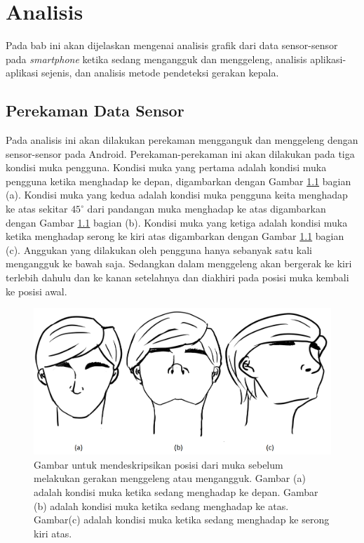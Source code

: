 \chapter{Analisis}
\label{chap:analisis}

Pada bab ini akan dijelaskan mengenai analisis grafik dari data sensor-sensor pada \textit{smartphone} ketika sedang mengangguk dan menggeleng, analisis aplikasi-aplikasi sejenis, dan analisis metode pendeteksi gerakan kepala. 

\section{Perekaman Data Sensor}
\label{sec:perekaman_data_sensor}

Pada analisis ini akan dilakukan perekaman mengganguk dan menggeleng dengan sensor-sensor pada Android. Perekaman-perekaman ini akan dilakukan pada tiga kondisi muka pengguna. Kondisi muka yang pertama adalah kondisi muka pengguna ketika menghadap ke depan, digambarkan dengan Gambar \ref{fig:posisi-muka} bagian (a). Kondisi muka yang kedua adalah kondisi muka pengguna keita menghadap ke atas sekitar $45^{\circ}$ dari pandangan muka menghadap ke atas digambarkan dengan Gambar \ref{fig:posisi-muka} bagian (b). Kondisi muka yang ketiga adalah kondisi muka ketika menghadap serong ke kiri atas digambarkan dengan Gambar \ref{fig:posisi-muka} bagian (c). Anggukan yang dilakukan oleh pengguna hanya sebanyak satu kali mengangguk ke bawah saja. Sedangkan dalam menggeleng akan bergerak ke kiri terlebih dahulu dan ke kanan setelahnya dan diakhiri pada posisi muka kembali ke posisi awal.

\begin{figure}[htbp]
\centering
\includegraphics[scale=0.4]{Gambar/posisi-muka.png}
\caption{Gambar untuk mendeskripsikan posisi dari muka sebelum melakukan gerakan menggeleng atau mengangguk. Gambar (a) adalah kondisi muka ketika sedang menghadap ke depan. Gambar (b) adalah kondisi muka ketika sedang menghadap ke atas. Gambar(c) adalah kondisi muka ketika sedang menghadap ke serong kiri atas.}
\label{fig:posisi-muka}
\end{figure}

